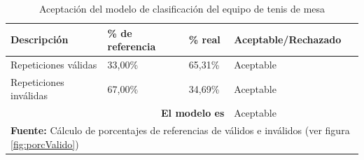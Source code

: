 \begin{table}[H]
\begin{center}
\caption{Aceptaci\'on del modelo de clasificaci\'on del equipo de tenis de mesa}
\label{tab:acModTenis}
\begin{tabular}{|l|l|l|l|}
\hline
\textbf{Descripci\'on} & \textbf{\% de referencia} & \textbf{\% real} & \textbf{Aceptable/Rechazado} \\ \hline
Repeticiones v\'alidas              & 33,00\%                   & 65,31\%          & Aceptable                    \\ \hline
Repeticiones inv\'alidas            & 67,00\%                   & 34,69\%          & Aceptable                    \\ \hline
\multicolumn{3}{|r|}{\textbf{El modelo es}}                         & Aceptable                    \\ \hline 
\multicolumn{4}{l}{\textbf{Fuente:} C\'alculo de porcentajes de referencias de v\'alidos e inv\'alidos (ver figura  \ref{fig:porcValido})}
\end{tabular}
\end{center}
\end{table}
